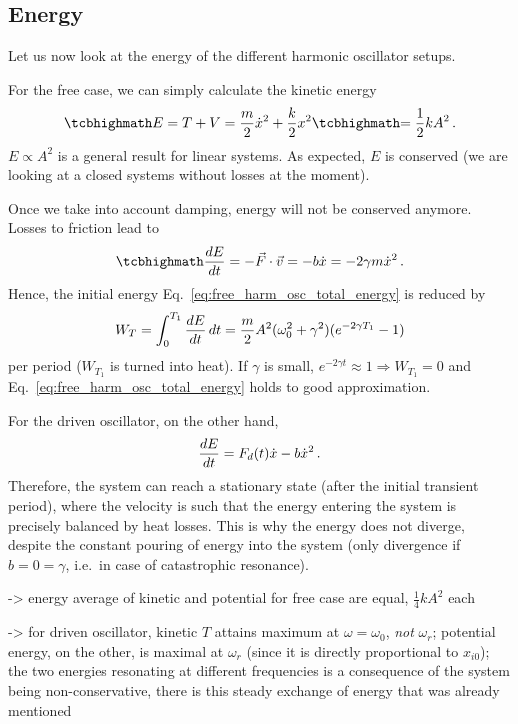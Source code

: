 \documentclass[../class_mech_main.tex]{subfiles}
\begin{document}
		\subsection{Energy}
Let us now look at the energy of the different harmonic oscillator setups.


For the free case, we can simply calculate the kinetic energy
\begin{equation}\label{eq:free_harm_osc_total_energy}
	\eqbox{E} = T + V = \frac{m}{2} \dot{x}^2 + \frac{k}{2} x^2 \eqbox{= \frac{1}{2} k A^2} \, .
\end{equation}
$E \propto A^2$ is a general result for linear systems. As expected, $E$ is conserved (we are looking at a closed systems without losses at the moment).

Once we take into account damping, energy will not be conserved anymore. Losses to friction lead to
\begin{equation}
	\eqbox{
		\dv{E}{t} = - \vec{F} \cdot \vec{v} = - b \dot{x} = - 2 \gamma m \dot{x}^2
	} \, .
\end{equation}
Hence, the initial energy Eq.~\eqref{eq:free_harm_osc_total_energy} is reduced by
\begin{equation}
	W_T = \int_0^{T_1} \dv{E}{t} \, dt = \frac{m}{2} A^2 (\omega_0^2 + \gamma^2) (e^{- 2 \gamma T_1} - 1)
\end{equation}
per period ($W_{T_1}$ is turned into heat). If $\gamma$ is small, $e^{- 2 \gamma t} \approx 1 \Rightarrow W_{T_1} = 0$ and Eq.~\eqref{eq:free_harm_osc_total_energy} holds to good approximation.


For the driven oscillator, on the other hand,
\begin{equation}
	\dv{E}{t} = F_d(t) \dot{x} - b \dot{x}^2
	\, .
\end{equation}
Therefore, the system can reach a stationary state (after the initial transient period), where the velocity is such that the energy entering the system is precisely balanced by heat losses. This is why the energy does not diverge, despite the constant pouring of energy into the system (only divergence if $b = 0 = \gamma$, i.e.~in case of catastrophic resonance).


-> energy average of kinetic and potential for free case are equal, $\frac{1}{4} k A^2$ each


-> for driven oscillator, kinetic $T$ attains maximum at $\omega = \omega_0$, \emph{not} $\omega_r$; potential energy, on the other, is maximal at $\omega_r$ (since it is directly proportional to $x_{i0}$); the two energies resonating at different frequencies is a consequence of the system being non-conservative, there is this steady exchange of energy that was already mentioned
\end{document}
